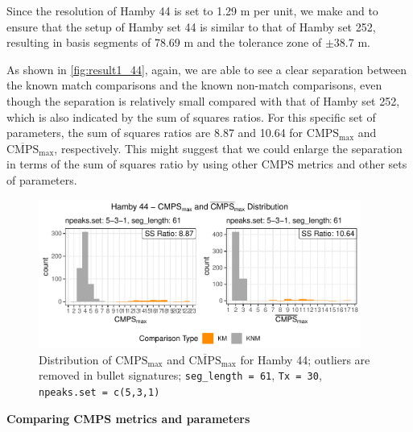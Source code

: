 Since the resolution of Hamby 44 is set to 1.29 \textmu m per unit, we
make  and  to ensure that the setup
of Hamby set 44 is similar to that of Hamby set 252, resulting in basis
segments of 78.69 \textmu m and the tolerance zone of \(\pm 38.7\)
\textmu m.

As shown in \autoref{fig:result1_44}, again, we are able to see a clear
separation between the known match comparisons and the known non-match
comparisons, even though the separation is relatively small compared
with that of Hamby set 252, which is also indicated by the sum of
squares ratios. For this specific set of parameters, the sum of squares
ratios are 8.87 and 10.64 for \(\mathrm{CMPS_{max}}\) and
\(\mathrm{\overline{CMPS}_{max}}\), respectively. This might suggest
that we could enlarge the separation in terms of the sum of squares
ratio by using other CMPS metrics and other sets of parameters.

\begin{Schunk}
\begin{figure}

{\centering \includegraphics[width=400px]{ju-hofmann_files/figure-latex/result1_44-1} 

}

\caption{Distribution of $\mathrm{CMPS_{max}}$ and $\mathrm{\overline{CMPS}_{max}}$ for Hamby 44; outliers are removed in bullet signatures; \texttt{seg\_length = 61}, \texttt{Tx = 30}, \texttt{npeaks.set = c(5,3,1)} }\label{fig:result1_44}
\end{figure}
\end{Schunk}

\textbf{Comparing CMPS metrics and parameters}

